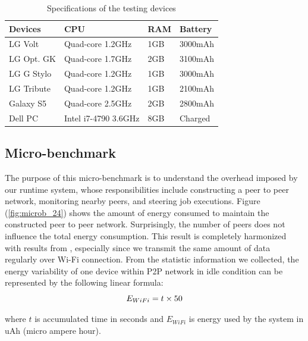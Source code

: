 \documentclass{sig-alternate}
\begin{document}
\begin{table}[h]
\caption{Specifications of the testing devices}
\label{table:devices}
\centering \small
\begin{tabular}{| l | l | l | l |}
    \hline
    \textbf{Devices} & \textbf{CPU} & \textbf{RAM} & \textbf{Battery} \\ \hline \hline
    LG Volt & Quad-core 1.2GHz & 1GB & 3000mAh\\ \hline
		LG Opt. GK & Quad-core 1.7GHz & 2GB & 3100mAh\\ \hline
		LG G Stylo & Quad-core 1.2GHz & 1GB & 3000mAh\\ \hline
		LG Tribute & Quad-core 1.2GHz & 1GB & 2100mAh\\ \hline
		Galaxy S5 & Quad-core 2.5GHz & 2GB & 2800mAh\\ \hline
		Dell PC & Intel i7-4790 3.6GHz & 8GB & Charged\\ \hline
\end{tabular}
\end{table}

\subsection{Micro-benchmark}
The purpose of this micro-benchmark is to understand the overhead imposed by our runtime system, whose responsibilities include constructing a peer to peer network, monitoring nearby peers, and steering job executions. Figure (\ref{fig:microb_24}) shows the amount of energy consumed to maintain the constructed peer to peer network. Surprisingly, the number of peers does not influence the total energy consumption. This result is completely harmonized with results from \cite{wifi_energy}, especially since we transmit the same amount of data regularly over Wi-Fi connection. From the statistic information we collected, the energy variability of one device within P2P network in idle condition can be represented by the following linear formula:
\begin{equation} \small
\label{eq:wifi_overload}
E_{WiFi} = t \times 50
\end{equation}

\noindent 
where $t$ is accumulated time in seconds and $E_{WiFi}$ is energy used by the system in uAh (micro ampere hour).
\end{document}
